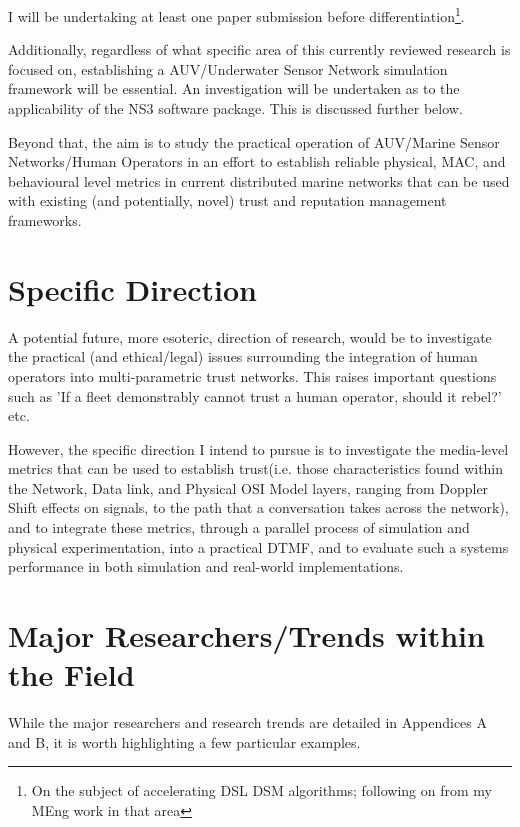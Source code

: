 \documentclass[twoside,10pt,a4paper]{Latex/Classes/PhDthesisPSnPDF}
\begin{document}
I will be undertaking at least one paper submission before
differentiation\footnote{On the subject of accelerating DSL DSM algorithms;
following on from my MEng work in that area}.

Additionally, regardless of what specific area of this currently reviewed
research is focused on, establishing a AUV/Underwater Sensor Network simulation
framework will be essential. An investigation will be undertaken as to the
applicability of the NS3 software package. This is discussed further below.

Beyond that, the aim is to study the practical operation of AUV/Marine Sensor
Networks/Human Operators in an effort to establish reliable physical, MAC, and 
behavioural level metrics in current distributed marine networks that can be 
used with existing (and potentially, novel) trust and reputation management 
frameworks.

\section{Specific Direction}
A potential future, more esoteric, direction of research, would be to 
investigate the practical (and ethical/legal) issues surrounding the 
integration of human operators into multi-parametric trust networks. This 
raises important questions such as 'If a fleet demonstrably cannot trust a 
human operator, should it rebel?' etc.  

However, the specific direction I intend to pursue is to investigate the 
media-level
metrics that can be used to establish trust(i.e. those characteristics found 
within the Network, Data link, and Physical OSI Model layers, ranging from 
Doppler Shift effects on signals, to the path that a conversation takes across 
the network), and to integrate these metrics,
through a parallel process of simulation and physical experimentation, into a
practical DTMF, and to evaluate such a systems performance in both simulation 
and real-world implementations.

\section{Major Researchers/Trends within the Field}
While the major researchers and research trends are detailed in Appendices A 
and B, it is worth highlighting a few particular examples. 
\end{document}
